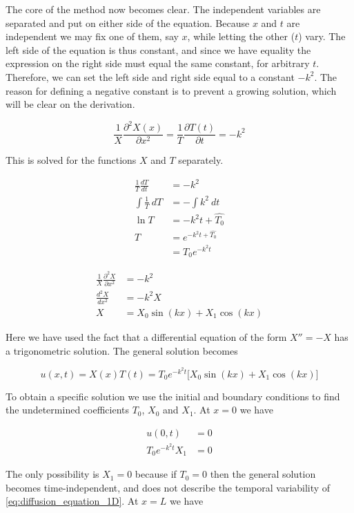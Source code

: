\documentclass[12pt]{extarticle}
\begin{document}
The core of the method now becomes clear. The independent variables are separated and put on either side of the equation. Because $x$ and $t$ are independent we may fix one of them, say $x$, while letting the other ($t$) vary. The left side of the equation is thus constant, and since we have equality the expression on the right side must equal the same constant, for arbitrary $t$. Therefore, we can set the left side and right side equal to a constant $-k^2$. The reason for defining a negative constant is to prevent a growing solution, which will be clear on the derivation.

\[ \frac{1}{X}\frac{\partial^2 X(x)}{\partial x^2} = \frac{1}{T}\frac{\partial T(t)}{\partial t} = -k^2\]

This is solved for the functions $X$ and $T$ separately. 

\begin{align*}
	\frac{1}{T} \frac{dT}{dt} &= -k^2 \\
	\int \frac{1}{T}\:dT &= -\int k^2\:dt \\
	\ln T &= -k^2 t + \hat{T_0} \\
	T &= e^{-k^2t + \hat{T_0}} \\
	&= T_0 e^{-k^2t}
\end{align*}

\begin{align}
	\frac{1}{X} \frac{\partial^2 X}{\partial x^2} &= -k^2 \\
	\frac{d^2 X}{dx^2} &= -k^2 X \\
	X &= X_0 \sin(kx) + X_1 \cos(kx)
\end{align}

Here we have used the fact that a differential equation of the form $X'' = -X$ has a trigonometric solution. The general solution becomes

\[ u(x,t) = X(x)T(t) = T_0 e^{-k^2 t} \big[X_0\sin(kx) + X_1 \cos(kx)\big] \]

To obtain a specific solution we use the initial and boundary conditions to find the undetermined coefficients $T_0$, $X_0$ and $X_1$. At $x=0$ we have

\begin{align*}
	u(0,t) &= 0 \\
	T_0 e^{-k^2 t} X_1 &= 0 
\end{align*}

The only possibility is $X_1 = 0$ because if $T_0=0$ then the general solution becomes time-independent, and does not describe the temporal variability of  \eqref{eq:diffusion_equation_1D}. At $x=L$ we have
\end{document}
